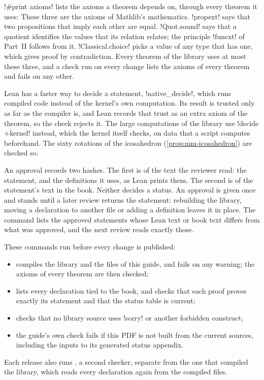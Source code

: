 \li!#print axioms! lists the axioms a theorem depends on, through every
theorem it uses:
These three are the axioms of Mathlib's mathematics. \li!propext! says that
two propositions that imply each other are equal. \li!Quot.sound! says that
a quotient identifies the values that its relation relates; the principle
\li!funext! of Part~II follows from it. \li!Classical.choice! picks a value
of any type that has one, which gives proof by contradiction. Every theorem
of the library uses at most these three, and a check run on every change
lists the axioms of every theorem and fails on any other.

Lean has a faster way to decide a statement, \li!native_decide!, which runs
compiled code instead of the kernel's own computation. Its result is trusted
only as far as the compiler is, and Lean records that trust as an extra
axiom of the theorem, so the check rejects it. The large computations of the
library use \li!decide +kernel! instead, which the kernel itself checks, on
data that a script computes beforehand. The sixty rotations of the
icosahedron (\cref{prop:mm-icosahedron}) are checked so.

An approval records two hashes. The first is of the text the reviewer
read: the statement, and the definitions it uses, as Lean prints them. The
second is of the statement's text in the book. Neither decides a status. An
approval is given once and stands until a later review returns the
statement: rebuilding the library, moving a declaration to another file or
adding a definition leaves it in place. The command
 lists the approved statements whose
Lean text or book text differs from what was approved, and the next review
reads exactly those.

These commands run before every change is published:
\begin{itemize}[leftmargin=1.4em]
\item {} compiles the library and the files of this
  guide, and fails on any warning; the axioms of every theorem are then
  checked;
\item {} lists every declaration tied to the book, and
   checks that each proof proves exactly its
  statement and that the status table is current;
\item {} checks that no library source uses \li!sorry!
  or another forbidden construct;
\item the guide's own check fails if this PDF is not built from the current
  sources, including the inputs to its generated status appendix.
\end{itemize}
Each release also runs , a second checker, separate from the
one that compiled the library, which reads every declaration again from the
compiled files.

